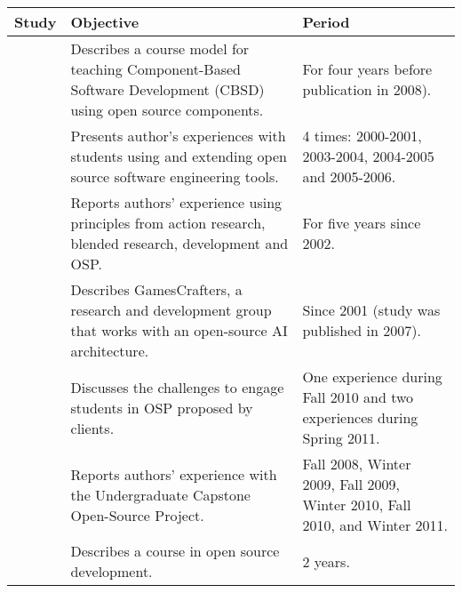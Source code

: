 
\begin{table}
	\centering
		{\begin{tabular}{p{1.2in}|p{2.0in}|p{1.8in} }
			\bf Study & \bf Objective & \bf Period  \\
			\hline
			\citep{id0035} & Describes a course model for teaching Component-Based Software Development (CBSD) using open source components.  & For four years before publication in 2008). \\
			
			 \citep{id0108} & Presents author's experiences with students using and extending open source software engineering tools. & 4 times: 2000-2001, 2003-2004, 2004-2005 and 2005-2006. \\
			 
			 \citep{id0109} & Reports authors' experience using principles from action research, blended research, development and OSP.  & For five years since 2002. \\
			 
			 \citep{id1634} & Describes GamesCrafters, a research and development group that works with an open-source AI architecture. & Since 2001 (study was published in 2007).  \\
			 
			 \citep{id0362} & Discusses the challenges to engage students in OSP proposed by clients. &  One experience during Fall 2010 and two experiences during Spring 2011. \\
			 
			\citep{id2076} & Reports authors' experience with the Undergraduate Capstone Open-Source Project. &  Fall 2008, Winter 2009, Fall 2009, Winter 2010, Fall 2010, and Winter 2011. \\
			
			\citep{id2205} & Describes a course in open source development. & 2 years. \\
		\end{tabular}}
	\label{tab:studiesLongPeriod}
\end{table}

